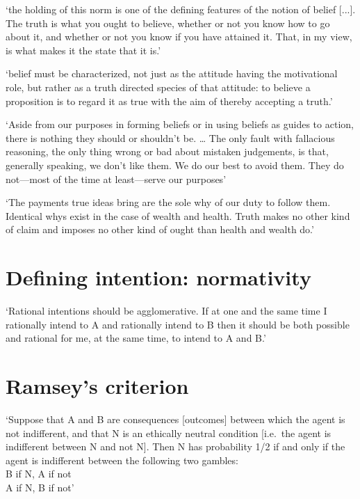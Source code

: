 \documentclass[11pt]{extarticle}
\begin{document}
\begin{multicols}{3}
‘the holding of this norm is one of the defining features of the notion of belief [...]. The truth is what you ought to believe, whether or not you know how to go about it, and whether or not you know if you have attained it. That, in my view, is what makes it the state that it is.’\citep{boghossian:2003_normativity} %

`belief must be characterized, not just as the attitude having the motivational role, but rather as a truth directed species of that attitude: to believe a proposition is to regard it as true with the aim of thereby accepting a truth.'\citep{Velleman:2000fq} %

‘Aside from our purposes in forming beliefs or in using beliefs as guides to action, there is nothing they should or shouldn’t be.  …  The only fault with fallacious reasoning, the only thing wrong or bad about mistaken judgements, is that, generally speaking, we don’t like them.  We do our best to avoid them.  They do not—most of the time at least—serve our purposes’\citep{Dretske:2000ky} %

‘The payments true ideas bring are the sole why of our duty to follow them.  Identical whys exist in the case of wealth and health.  Truth makes no other kind of claim and imposes no other kind of ought than health and wealth do.’\citep{James:1907ae} %

\section{Defining intention: normativity}
`Rational intentions should be agglomerative. If at one and the same time I rationally intend to A and rationally intend to B then it should be both possible and rational for me, at the same time, to intend to A and B.'\citep{bratman_faces_1999} %
 

\section{Ramsey's criterion}
`Suppose that A and B are consequences [outcomes] between which the agent is not indifferent, and that N is an ethically neutral condition [i.e.\ the agent is indifferent between N and not N]. 
Then N has probability 1/2 if and only if the agent is indifferent between the following two gambles:
	\\ \hspace*{10 mm} B if N, A if not 
	\\ \hspace*{10 mm} A if N, B if not'%
	\citep%
	{Jeffrey:1983oe}



\end{multicols}
\end{document}
